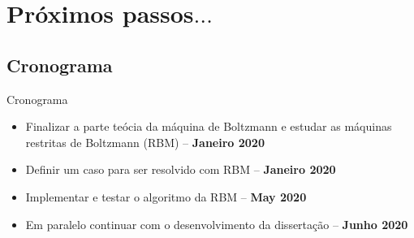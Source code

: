 \section{Próximos passos$\dots$}

\subsection{Cronograma}
\begin{frame}{Cronograma}%
  \justifying%
  \begin{itemize}
    \item Finalizar a parte teócia da máquina de Boltzmann e estudar as máquinas restritas de Boltzmann (RBM) -- \textbf{Janeiro 2020}
    \item Definir um caso para ser resolvido com RBM -- \textbf{Janeiro 2020}
    \item Implementar e testar o algoritmo da RBM -- \textbf{May 2020}
    \item Em paralelo continuar com o desenvolvimento da dissertação -- \textbf{Junho 2020}
  \end{itemize}
\end{frame}
